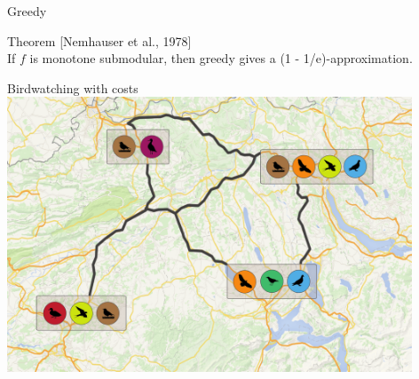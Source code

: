 \documentclass[xetex,10pt,mathserif]{beamer}
\newcommand{\qcite}[1]{{\small\color{gray}[#1]}}
\begin{document}
\begin{frame}{Greedy}

{\large Theorem} \qcite{Nemhauser et al., 1978}\\[1em]
\hspace{0.5em}If $f$ is monotone submodular, then greedy gives a (1 - 1/e)-approximation.
\end{frame}

\begin{frame}{Birdwatching with costs}
\centering
\includegraphics[width=4.75in]{figures/intro_roads.pdf}
\end{frame}
\end{document}
